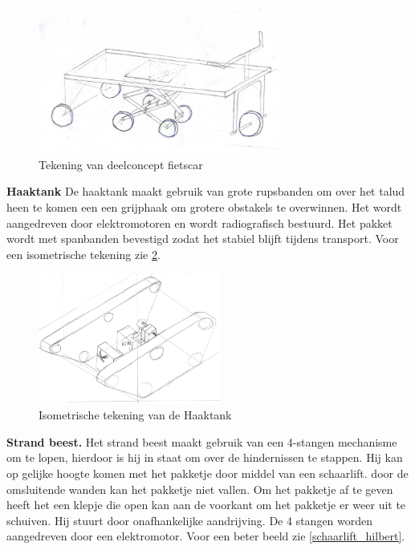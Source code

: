 \begin{figure}[H]
    \centering
    \includegraphics[width = 80mm]{04_idee_ontwikkeling/Deelontwerp-Kevin.jpeg}
    \caption{Tekening van deelconcept fietscar}
    \label{fig: fietscar}
\end{figure}

\vspace{\baselineskip}
{\bf Haaktank} De haaktank maakt gebruik van grote rupsbanden om over het talud heen te komen een een grijphaak om grotere obstakels te overwinnen. Het wordt aangedreven door elektromotoren en wordt radiografisch bestuurd. Het pakket wordt met spanbanden bevestigd zodat het stabiel blijft tijdens transport. Voor een isometrische tekening zie \cref{fig:Haaktank}.


\begin{figure}[H]
    \centering
    \includegraphics[width = 60mm]{04_idee_ontwikkeling/Deel_ontwerp_robin.png}
    \caption{Isometrische tekening van de Haaktank}
    \label{fig:Haaktank}
\end{figure}


    
\vspace{\baselineskip}
{\bf Strand beest.} 
Het strand beest maakt gebruik van een 4-stangen mechanisme om te lopen, hierdoor is hij in staat om over de hindernissen te stappen. Hij kan op gelijke hoogte komen met het pakketje door middel van een schaarlift. door de omsluitende wanden kan het pakketje niet vallen. Om het pakketje af te geven heeft het een klepje die open kan aan de voorkant om het pakketje er weer uit te schuiven. Hij stuurt door onafhankelijke aandrijving. De 4 stangen worden aangedreven door een elektromotor. Voor een beter beeld zie \cref{schaarlift_hilbert}.

